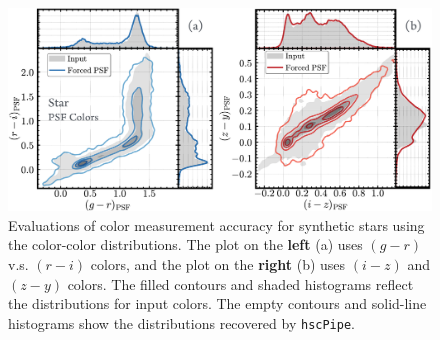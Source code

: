 \documentclass[useamsfonts]{pasj01}
\def\hscpipe{\texttt{hscPipe}}
\begin{document}
\begin{figure}
    \begin{center}
        \includegraphics[width=\textwidth]{fig/synpipe_psf_cdist}
    \end{center}
    \caption{
        Evaluations of color measurement accuracy for synthetic stars using
        the color-color distributions.
        The plot on the \textbf{left} (a) uses $(g-r)$ v.s. $(r-i)$ colors, and the plot 
        on the \textbf{right} (b) uses $(i-z)$ and $(z-y)$ colors.
        The filled contours and shaded histograms reflect the distributions for input
        colors.
        The empty contours and solid-line histograms show the distributions recovered
        by \hscpipe{}.
        }
    \label{fig:psf_cdist}
\end{figure}
\end{document}
